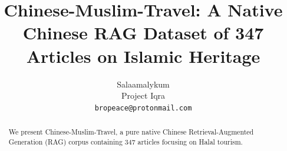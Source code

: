 \documentclass{article}
\title{Chinese-Muslim-Travel: A Native Chinese RAG Dataset of 347 Articles on Islamic Heritage}
\author{Salaamalykum \\ Project Iqra \\ \texttt{bropeace@protonmail.com}}
\begin{document}
\maketitle
\begin{abstract}
We present Chinese-Muslim-Travel, a pure native Chinese Retrieval-Augmented Generation (RAG) corpus containing 347 articles focusing on Halal tourism.
\end{abstract}
\end{document}
